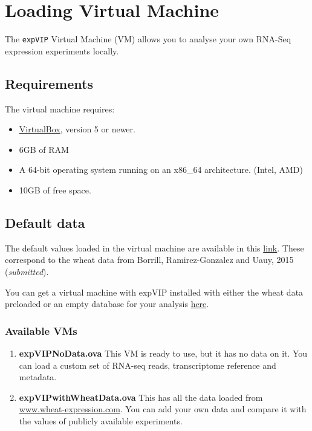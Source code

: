 \section{Loading Virtual Machine}\label{loading-virtual-machine}

The \lstinline!expVIP! Virtual Machine (VM) allows you to analyse your
own RNA-Seq expression experiments locally.

\subsection{Requirements}\label{requirements}

The virtual machine requires:

\begin{itemize}
\itemsep1pt\parskip0pt
\item
  \href{https://www.virtualbox.org}{VirtualBox}, version 5 or newer.
\item
  6GB of RAM
\item
  A 64-bit operating system running on an x86\_64 architecture. (Intel,
  AMD)
\item
  10GB of free space.
\end{itemize}

\subsection{Default data}\label{default-data}

The default values loaded in the virtual machine are available in this
\href{https://www.dropbox.com/sh/n15tpsqj92wfn8u/AABivEEUj4sRd9tG830WnSi4a?dl=0}{link}.
These correspond to the wheat data from Borrill, Ramirez-Gonzalez and
Uauy, 2015 (\emph{submitted}).

You can get a virtual machine with expVIP installed with either the
wheat data preloaded or an empty database for your analysis
\href{https://www.dropbox.com/sh/73i7ulj1hk6gdpd/AAARGuJDN0MnaZ7iLmMzSSp9a?dl=0}{here}.

\subsubsection{Available VMs}\label{available-vms}

\begin{enumerate}
\def\labelenumi{\arabic{enumi}.}
\itemsep1pt\parskip0pt
\item
  \textbf{expVIPNoData.ova} This VM is ready to use, but it has no data
  on it. You can load a custom set of RNA-seq reads, transcriptome
  reference and metadata.
\item
  \textbf{expVIPwithWheatData.ova} This has all the data loaded from
  \href{http://www.wheat-expression.com}{www.wheat-expression.com}. You
  can add your own data and compare it with the values of publicly
  available experiments.
\end{enumerate}

